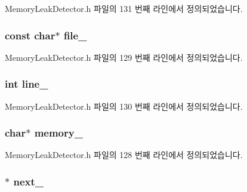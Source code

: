 Memory\+Leak\+Detector.\+h 파일의 131 번째 라인에서 정의되었습니다.

\subsubsection[{\texorpdfstring{file\+\_\+}{file_}}]{\setlength{\rightskip}{0pt plus 5cm}const char$\ast$ file\+\_\+}\hypertarget{struct_memory_leak_detector_node_a1f340748cdde8f8781fa62b4a3562190}{}\label{struct_memory_leak_detector_node_a1f340748cdde8f8781fa62b4a3562190}


Memory\+Leak\+Detector.\+h 파일의 129 번째 라인에서 정의되었습니다.

\subsubsection[{\texorpdfstring{line\+\_\+}{line_}}]{\setlength{\rightskip}{0pt plus 5cm}int line\+\_\+}\hypertarget{struct_memory_leak_detector_node_ac515e5f5602db49593f96316f1b5c054}{}\label{struct_memory_leak_detector_node_ac515e5f5602db49593f96316f1b5c054}


Memory\+Leak\+Detector.\+h 파일의 130 번째 라인에서 정의되었습니다.

\subsubsection[{\texorpdfstring{memory\+\_\+}{memory_}}]{\setlength{\rightskip}{0pt plus 5cm}char$\ast$ memory\+\_\+}\hypertarget{struct_memory_leak_detector_node_a6cdb5ad30702010eaf86e4e5f26defce}{}\label{struct_memory_leak_detector_node_a6cdb5ad30702010eaf86e4e5f26defce}


Memory\+Leak\+Detector.\+h 파일의 128 번째 라인에서 정의되었습니다.

\subsubsection[{\texorpdfstring{next\+\_\+}{next_}}]{$\ast$ next\+\_\+\hspace{0.3cm}{\ttfamily [private]}}\hypertarget{struct_memory_leak_detector_node_a6a718fbf408f23d29c6ef9167005968c}{}\label{struct_memory_leak_detector_node_a6a718fbf408f23d29c6ef9167005968c}


